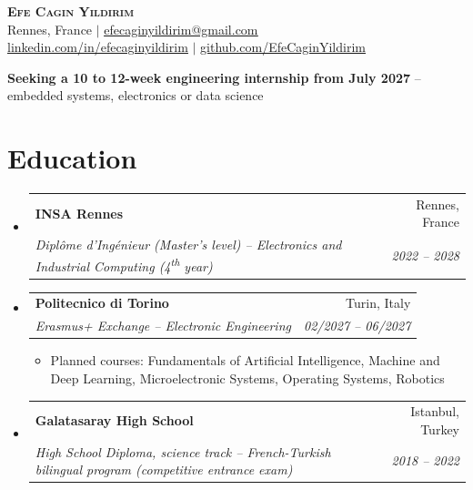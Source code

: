 \documentclass[a4paper,10pt]{article}
\makeatletter
\newcommand{\recherche}{embedded systems, electronics or data science}
\newcommand{\resumeItem}[1]{
  \item\small{
    {#1 \vspace{-2pt}}
  }
}
\newcommand{\resumeSubheading}[4]{
  \vspace{-2pt}\item
    \begin{tabular*}{0.97\textwidth}[t]{
      l@{\extracolsep{\fill}}r
    }
      \textbf{#1} & #2 \\
      \textit{\small#3} & \textit{\small #4} \\
    \end{tabular*}\vspace{-7pt}
}
\newcommand{\resumeSubHeadingListStart}{
  \begin{itemize}[leftmargin=0.15in, label={}]
}
\newcommand{\resumeSubHeadingListEnd}{
  \end{itemize}
}
\newcommand{\resumeItemListStart}{
  \vspace{2pt}\begin{itemize}[label=\textbullet]
}
\newcommand{\resumeItemListEnd}{
  \end{itemize}\vspace{-5pt}
}
\makeatother
\begin{document}
\begin{center}
    \textbf{\Huge \scshape Efe Cagin Yildirim} \\ \vspace{2pt}
    \small
    Rennes, France $|$
    \href{mailto:efecaginyildirim@gmail.com}{\underline{efecaginyildirim@gmail.com}} \\
    \href{https://www.linkedin.com/in/efecaginyildirim/}{\underline{linkedin.com/in/efecaginyildirim}} $|$
    \href{https://github.com/EfeCaginYildirim}{\underline{github.com/EfeCaginYildirim}}
\end{center}

\vspace{-6pt}
\begin{center}
  \small\textbf{Seeking a 10 to 12-week engineering internship from July 2027}
  -- \recherche
\end{center}
\vspace{-4pt}

\section{Education}
  \resumeSubHeadingListStart

    \resumeSubheading
      {INSA Rennes}
      {Rennes, France}
      {Diplôme d'Ingénieur (Master's level) -- Electronics and Industrial Computing (4\textsuperscript{th} year)}
      {2022 -- 2028}
      \vspace{4pt}

    \resumeSubheading
      {Politecnico di Torino}
      {Turin, Italy}
      {Erasmus+ Exchange -- Electronic Engineering}
      {02/2027 -- 06/2027}

      \resumeItemListStart
        \resumeItem{
          Planned courses: Fundamentals of Artificial Intelligence, Machine and Deep Learning,
          Microelectronic Systems, Operating Systems, Robotics
        }
      \resumeItemListEnd
      \vspace{9pt}

    \resumeSubheading
      {Galatasaray High School}
      {Istanbul, Turkey}
      {High School Diploma, science track -- French-Turkish bilingual program (competitive entrance exam)}
      {2018 -- 2022}

  \resumeSubHeadingListEnd
\end{document}
